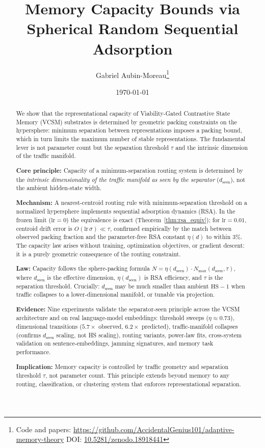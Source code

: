 \documentclass[11pt]{article}
\title{Memory Capacity Bounds via Spherical Random Sequential Adsorption}
\author{Gabriel Aubin-Moreau\thanks{Code and papers: \url{https://github.com/AccidentalGenius101/adaptive-memory-theory} \quad DOI: \href{https://doi.org/10.5281/zenodo.18918441}{10.5281/zenodo.18918441}}}
\date{\today}
\begin{document}
\maketitle

\begin{abstract}
\noindent We show that the representational capacity of Viability-Gated Contrastive State Memory (VCSM) substrates is determined by geometric packing constraints on the hypersphere: minimum separation between representations imposes a packing bound, which in turn limits the maximum number of stable representations. The fundamental lever is not parameter count but the separation threshold $\tau$ and the intrinsic dimension of the traffic manifold.

\noindent\textbf{Core principle:} Capacity of a minimum-separation routing system is determined by the \emph{intrinsic dimensionality of the traffic manifold as seen by the separator} ($d_{\text{seen}}$), not the ambient hidden-state width.

\noindent\textbf{Mechanism:} A nearest-centroid routing rule with minimum-separation threshold on a normalized hypersphere implements sequential adsorption dynamics (RSA). In the frozen limit ($\mathrm{lr} = 0$) the equivalence is exact (Theorem~\ref{thm:rsa_equiv}); for $\mathrm{lr} = 0.01$, centroid drift error is $O(\mathrm{lr}\,\sigma) \ll \tau$, confirmed empirically by the match between observed packing fraction and the parameter-free RSA constant $\eta(d)$ to within 3\%. The capacity law arises without training, optimization objectives, or gradient descent: it is a purely geometric consequence of the routing constraint.

\noindent\textbf{Law:} Capacity follows the sphere-packing formula $N = \eta(d_{\text{seen}}) \cdot N_{\max}(d_{\text{seen}}, \tau)$, where $d_{\text{seen}}$ is the effective dimension, $\eta(d_{\text{seen}})$ is RSA efficiency, and $\tau$ is the separation threshold. Crucially: $d_{\text{seen}}$ may be much smaller than ambient $\mathrm{HS}-1$ when traffic collapses to a lower-dimensional manifold, or tunable via projection.

\noindent\textbf{Evidence:} Nine experiments validate the separator-seen principle across the VCSM architecture and on real language-model embeddings: threshold sweeps ($\eta \approx 0.73$), dimensional transitions ($5.7\times$ observed, $6.2\times$ predicted), traffic-manifold collapses (confirms $d_{\text{seen}}$ scaling, not HS scaling), routing variants, power-law fits, cross-system validation on sentence-embeddings, jamming signatures, and memory task performance.

\noindent\textbf{Implication:} Memory capacity is controlled by traffic geometry and separation threshold $\tau$, not parameter count. This principle extends beyond memory to any routing, classification, or clustering system that enforces representational separation.
\end{abstract}
\end{document}
